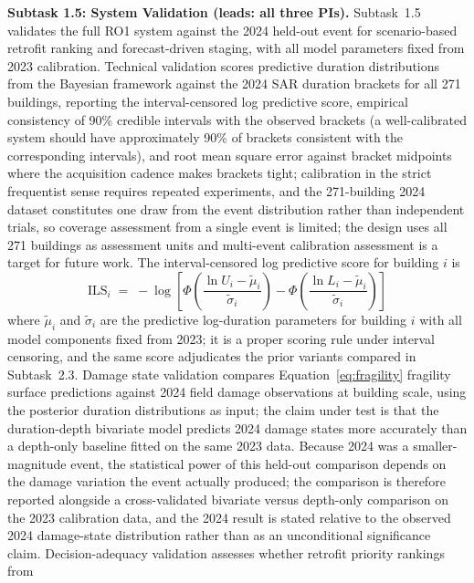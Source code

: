 \documentclass[11pt]{article}
\begin{document}
\textbf{Subtask 1.5: System Validation (leads: all three PIs).}
Subtask~1.5 validates the full RO1 system against the 2024 held-out event for scenario-based retrofit ranking and forecast-driven staging, with all model parameters fixed from 2023 calibration.
Technical validation scores predictive duration distributions from the Bayesian
framework against the 2024 SAR duration brackets for all 271 buildings, reporting
the interval-censored log predictive score, empirical consistency of 90\% credible
intervals with the observed brackets (a well-calibrated system should have
approximately 90\% of brackets consistent with the corresponding intervals), and
root mean square error against bracket midpoints where the acquisition cadence
makes brackets tight; calibration in the strict
frequentist sense requires repeated experiments, and the 271-building 2024 dataset
constitutes one draw from the event distribution rather than independent trials,
so coverage assessment from a single event is limited; the design uses all 271
buildings as assessment units and multi-event calibration assessment is a target
for future work.
The interval-censored log predictive score for building $i$ is
\begin{equation}\label{eq:lps}
  \mathrm{ILS}_i \;=\; -\log\!\left[
    \Phi\!\left(\frac{\ln U_i - \tilde{\mu}_i}{\tilde{\sigma}_i}\right) -
    \Phi\!\left(\frac{\ln L_i - \tilde{\mu}_i}{\tilde{\sigma}_i}\right)\right]
\end{equation}
where $\tilde{\mu}_i$ and $\tilde{\sigma}_i$ are the predictive log-duration
parameters for building $i$ with all model components fixed from 2023; it is a
proper scoring rule under interval censoring, and the same score adjudicates the
prior variants compared in Subtask~2.3.
Damage state validation compares Equation~\eqref{eq:fragility} fragility surface predictions against
2024 field damage observations at building scale, using the posterior duration
distributions as input; the claim under test is that the duration-depth bivariate
model predicts 2024 damage states more accurately than a depth-only baseline fitted
on the same 2023 data.
Because 2024 was a smaller-magnitude event, the statistical power of this held-out
comparison depends on the damage variation the event actually produced; the
comparison is therefore reported alongside a cross-validated bivariate versus
depth-only comparison on the 2023 calibration data, and the 2024 result is stated
relative to the observed 2024 damage-state distribution rather than as an
unconditional significance claim.
Decision-adequacy validation assesses whether retrofit priority rankings from
\end{document}
